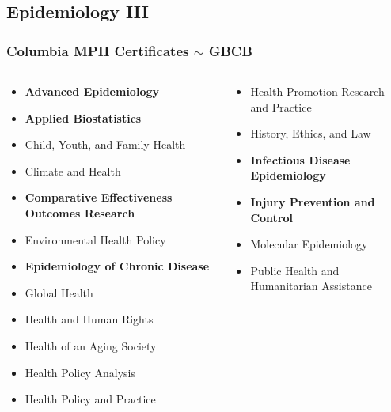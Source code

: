 \documentclass[compress]{beamer}
\begin{document}
\subsection[Epidemiology III]{Epidemiology III}
    \begin{frame}[Basic2] \frametitle{Columbia MPH Certificates $\sim$ GBCB}
        \begin{columns}
            \begin{column}{0.5\textwidth}
                \begin{itemize}
                    \tiny
                    \item \textbf{Advanced Epidemiology}
                    \item \textbf{Applied Biostatistics}
                    \item Child, Youth, and Family Health
                    \item Climate and Health
                    \item \textbf{Comparative Effectiveness Outcomes Research}
                    \item Environmental Health Policy
                    \item \textbf{Epidemiology of Chronic Disease}
                    \item Global Health
                    \item Health and Human Rights
                    \item Health of an Aging Society
                    \item Health Policy Analysis
                    \item Health Policy and Practice
                \end{itemize}
            \end{column}
            \begin{column}{0.5\textwidth}
                \begin{itemize}
                    \tiny
                    \item Health Promotion Research and Practice
                    \item History, Ethics, and Law
                    \item \textbf{Infectious Disease Epidemiology}
                    \item \textbf{Injury Prevention and Control}
                    \item Molecular Epidemiology
                    \item Public Health and Humanitarian Assistance

\end{itemize}
\end{column}
\end{columns}
\end{frame}
\end{document}
